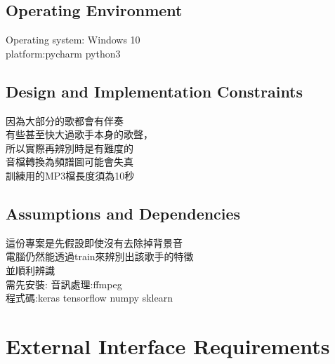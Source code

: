 \documentclass{article}
\begin{document}
\begin{CJK}{UTF8}{bkai}
\subsection{\Large Operating Environment \\}
 \Large Operating system: Windows 10\\
platform:pycharm python3\\

\subsection{\Large Design and Implementation Constraints\\}
   \Large 因為大部分的歌都會有伴奏 \\
有些甚至快大過歌手本身的歌聲，\\
所以實際再辨別時是有難度的\\
音檔轉換為頻譜圖可能會失真\\
訓練用的MP3檔長度須為10秒
\subsection{\Large  Assumptions and Dependencies\\}
  \Large  這份專案是先假設即使沒有去除掉背景音\\
 電腦仍然能透過train來辨別出該歌手的特徵\\
並順利辨識\\
需先安裝:
音訊處理:ffmpeg\\
程式碼:keras tensorflow numpy sklearn
\newpage

\section{\huge\bf  \color{blue} External Interface Requirements\\}

\end{CJK}
\end{document}
